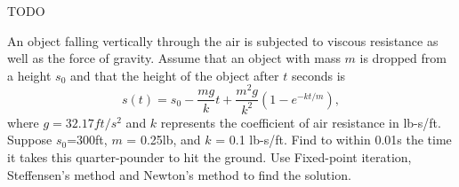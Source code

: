 \documentclass[10pt]{jhwhw}
\begin{document}
\solution

	TODO

\problem{}

\solution

	An object falling vertically through the air is subjected to viscous resistance as well as the
	force of gravity. Assume that an object with mass $m$ is dropped from a height $s_0$ and that the height of the
	object after $t$ seconds is
	$$
		s(t) = s_0 - \frac{mg}{k}t + \frac{m^2g}{k^2}(1-e^{-kt/m}),
	$$
	where $g=32.17 ft/s^2$ and $k$ represents the coefficient of air resistance in lb-s/ft.
	Suppose $s_0$=300ft, $m$ = 0.25lb, and $k$ = 0.1 lb-s/ft. Find to within 0.01s the time it takes
	this quarter-pounder to hit the ground. Use Fixed-point iteration, Steffensen's method and Newton's method
	to find the solution.
\end{document}
